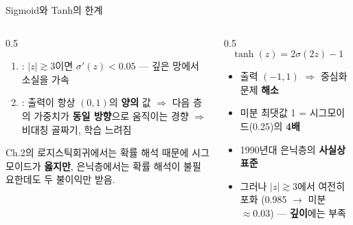 \begin{frame}{Sigmoid와 Tanh의 한계}
  \small
  \begin{columns}[T]
    \begin{column}{0.5\textwidth}
      \begin{enumerate}
        \item {}: $|z| \gtrsim 3$이면 $\sigma'(z) < 0.05$ —
          깊은 망에서 소실을 가속
        \item {}: 출력이 항상 $(0,1)$의 \textbf{양의} 값
          $\Rightarrow$ 다음 층의 가중치가 \textbf{동일 방향}으로
          움직이는 경향 $\Rightarrow$ 비대칭 골짜기, 학습 느려짐
      \end{enumerate}
      {\footnotesize Ch.2의 로지스틱회귀에서는 확률 해석 때문에
      시그모이드가 \textbf{옳지만}, 은닉층에서는 확률 해석이
      불필요한데도 두 불이익만 받음.}
    \end{column}
    \begin{column}{0.5\textwidth}
      \[
      \tanh(z) = 2\sigma(2z) - 1
      \]
      \begin{itemize}
        \item 출력 $(-1,1)$ $\Rightarrow$ 중심화 문제 \textbf{해소}
        \item 미분 최댓값 1 = 시그모이드(0.25)의 \textbf{4배}
        \item 1990년대 은닉층의 \textbf{사실상 표준}
        \item 그러나 $|z| \gtrsim 3$에서 여전히 포화
          (0.985 $\to$ 미분 $\approx 0.03$) — \textbf{깊이}에는 부족
      \end{itemize}
    \end{column}
  \end{columns}
\end{frame}
